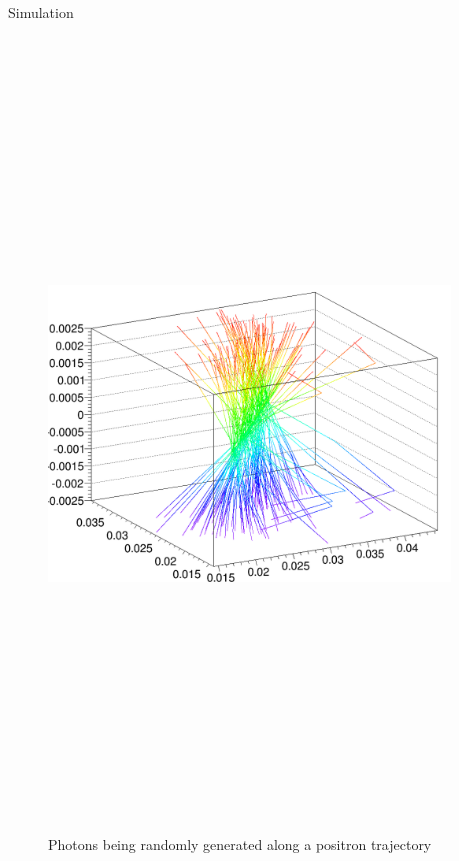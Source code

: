 \documentclass[final]{beamer}
\newlength{\onecolwid}
\newlength{\twocolwid}
\begin{document}
\begin{frame}[t]
\begin{columns}[t]
\begin{column}{\twocolwid}
\begin{columns}[t,totalwidth=\twocolwid]
\begin{column}{\onecolwid}
\begin{block}{Simulation}
\begin{figure}
\includegraphics[height=21cm]{picsim}
\caption{Photons being randomly generated along a positron trajectory}
\end{figure} 
 
\end{block}



\end{column} %

\begin{column}{\onecolwid}\vspace{-.6in} %


\end{column}
\end{columns}
\end{column}
\end{columns}
\end{frame}
\end{document}
